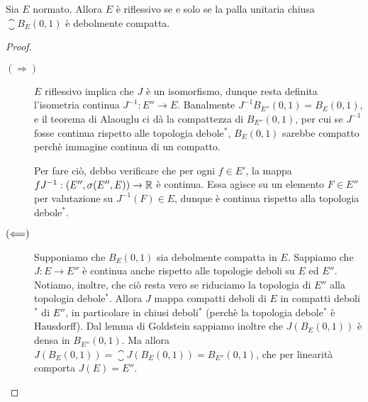 \begin{theorem}[Kakutani]
\label{th:kakutani}
	Sia $E$ normato.
	Allora $E$ è riflessivo se e solo se la palla unitaria chiusa $\closure B_E(0,1)$ è debolmente compatta.
\end{theorem}
\begin{proof}
	\leavevmode
	\begin{description}
		\item[$(\Longrightarrow)$] $E$ riflessivo implica che $J$ è un isomorfismo, dunque resta definita l'isometria continua $J^{-1} : E'' \to E$. Banalmente $J^{-1}B_{E''}(0,1) = B_E(0,1)$, e il teorema di Alaouglu ci dà la compattezza di $B_{E''}(0,1)$, per cui se $J^{-1}$ fosse continua rispetto alle topologia debole$^*$, $B_E(0,1)$ sarebbe compatto perchè immagine continua di un compatto.

		Per fare ciò, debbo verificare che per ogni $f \in E'$, la mappa $f J^{-1} : (E'', \sigma(E'', E)) \to \mathbb{R}$ è continua. Essa agisce su un elemento $F \in E''$ per valutazione su $J^{-1}(F) \in E$, dunque è continua rispetto alla topologia debole$^*$.

		\item[$(\Longleftarrow)$] Supponiamo che $B_E(0,1)$ sia debolmente compatta in $E$. Sappiamo che $J:E \to E''$ è continua anche rispetto alle topologie deboli su $E$ ed $E''$. Notiamo, inoltre, che ciò resta vero se riduciamo la topologia di $E''$ alla topologia debole$^*$. Allora $J$ mappa compatti deboli di $E$ in compatti deboli$^*$ di $E''$, in particolare in chiusi deboli$^*$ (perchè la topologia debole$^*$ è Hausdorff). Dal lemma di Goldstein sappiamo inoltre che $J(B_E(0,1))$ è densa in $B_{E''}(0,1)$. Ma allora $J(B_E(0,1)) = \closure{J(B_E(0,1))} = B_{E''}(0,1)$, che per linearità comporta $J(E) = E''$.
	\end{description}
\end{proof}

